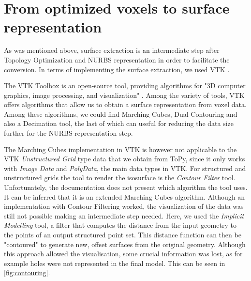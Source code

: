 \section{From optimized voxels to surface representation}
As was mentioned above, surface extraction is an intermediate step after Topology Optimization and NURBS representation in order to facilitate the conversion. In terms of implementing the surface extraction, we used VTK \cite{VTKToolbox}.




The VTK Toolbox is an open-source tool, providing algorithms for "3D computer graphics, image processing, and visualization" \cite{VTKToolbox}. Among the variety of tools, VTK offers algorithms that allow us to obtain a surface representation from voxel data. Among these algorithms, we could find Marching Cubes, Dual Contouring and also a Decimation tool, the last of which can useful for reducing the data size further for the NURBS-representation step.


The Marching Cubes implementation in VTK is however not applicable to the VTK \emph{Unstructured Grid} type data that we obtain from ToPy, since it only works with \emph{Image Data} and \emph{PolyData}, the main data types in VTK. For structured and unstructured grids the tool to render the isosurface is the \emph{Contour Filter} tool. Unfortunately, the documentation does not present which algorithm the tool uses. It can be inferred that it is an extended Marching Cubes algorithm. %
Although an implementation with Contour Filtering worked, the visualization of the data was still not possible
making an intermediate step needed. Here, we used the \textit{Implicit Modelling} tool, a filter that
computes the distance from the input geometry to the points of an output structured point set.
This distance function can then be "contoured" to generate new, offset surfaces from the original
geometry. Although this approach allowed the visualisation, some crucial information was lost, as for example holes were not represented in the final model. This can be seen in \autoref{fig:contouring}.


